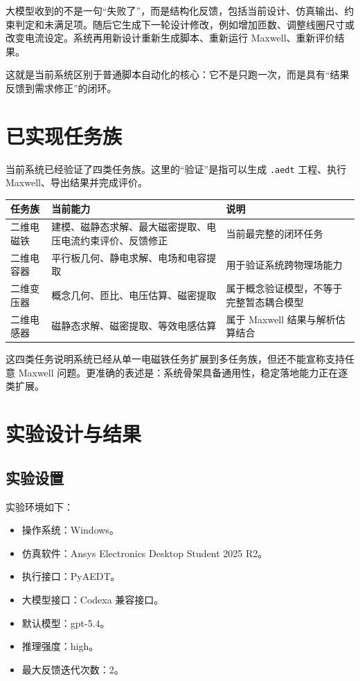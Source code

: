 \documentclass[12pt,a4paper]{ctexart}
\begin{document}
大模型收到的不是一句“失败了”，而是结构化反馈，包括当前设计、仿真输出、约束判定和未满足项。随后它生成下一轮设计修改，例如增加匝数、调整线圈尺寸或改变电流设定。系统再用新设计重新生成脚本、重新运行 Maxwell、重新评价结果。

这就是当前系统区别于普通脚本自动化的核心：它不是只跑一次，而是具有“结果反馈到需求修正”的闭环。

\section{已实现任务族}

当前系统已经验证了四类任务族。这里的“验证”是指可以生成 \texttt{.aedt} 工程、执行 Maxwell、导出结果并完成评价。

\begin{table}[h]
\centering
\begin{tabularx}{\textwidth}{>{\raggedright\arraybackslash}p{3.1cm}X>{\raggedright\arraybackslash}p{3.1cm}}
\toprule
任务族 & 当前能力 & 说明 \\
\midrule
二维电磁铁 & 建模、磁静态求解、最大磁密提取、电压电流约束评价、反馈修正 & 当前最完整的闭环任务 \\
二维电容器 & 平行板几何、静电求解、电场和电容提取 & 用于验证系统跨物理场能力 \\
二维变压器 & 概念几何、匝比、电压估算、磁密提取 & 属于概念验证模型，不等于完整暂态耦合模型 \\
二维电感器 & 磁静态求解、磁密提取、等效电感估算 & 属于 Maxwell 结果与解析估算结合 \\
\bottomrule
\end{tabularx}
\end{table}

这四类任务说明系统已经从单一电磁铁任务扩展到多任务族，但还不能宣称支持任意 Maxwell 问题。更准确的表述是：系统骨架具备通用性，稳定落地能力正在逐类扩展。

\section{实验设计与结果}

\subsection{实验设置}

实验环境如下：

\begin{itemize}
  \item 操作系统：Windows。
  \item 仿真软件：Ansys Electronics Desktop Student 2025 R2。
  \item 执行接口：PyAEDT。
  \item 大模型接口：Codexa 兼容接口。
  \item 默认模型：gpt-5.4。
  \item 推理强度：high。
  \item 最大反馈迭代次数：2。
\end{itemize}
\end{document}

